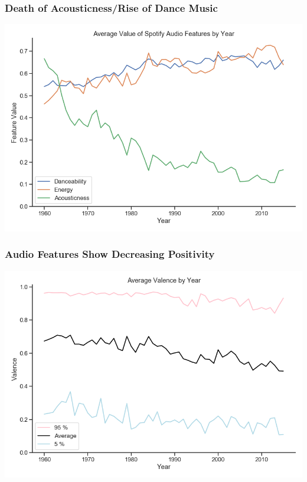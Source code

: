 \documentclass[10pt]{beamer}
\begin{document}
\begin{frame}
\frametitle{Death of Acousticness/Rise of Dance Music}

{
    \centering
    \includegraphics[width=\textwidth, height=\textheight,keepaspectratio]{the_victory_of_electric_music.png}
    \par
}

\end{frame}

\begin{frame}
\frametitle{Audio Features Show Decreasing Positivity}

{
    \centering
    \includegraphics[width=\textwidth, height=\textheight,keepaspectratio]{spotify_valence_by_year.png}
    \par
}

\end{frame}
\end{document}
